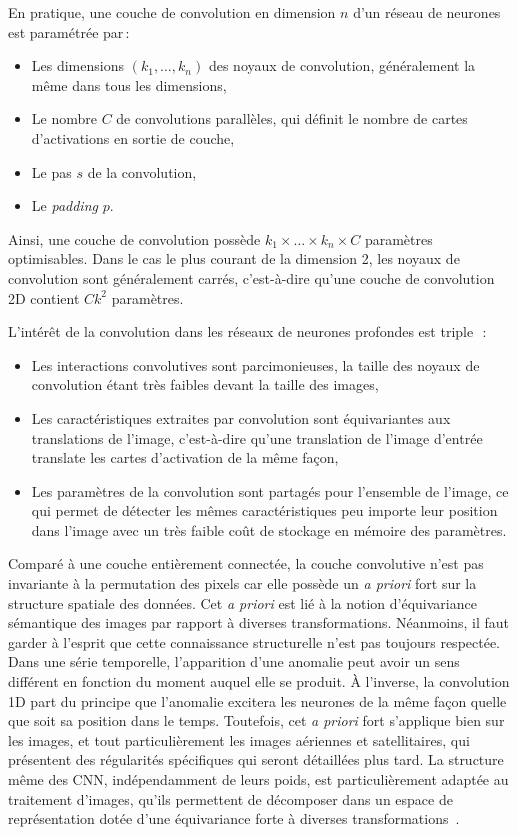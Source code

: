 En pratique, une couche de convolution en dimension $n$ d'un réseau de neurones est paramétrée par\,:
\begin{itemize}
  \item Les dimensions $(k_1, \dots, k_n)$ des noyaux de convolution, généralement la même dans tous les dimensions,
  \item Le nombre $C$ de convolutions parallèles, qui définit le nombre de cartes d'activations en sortie de couche,
  \item Le pas $s$ de la convolution,
  \item Le \emph{padding} $p$.
\end{itemize}

Ainsi, une couche de convolution possède $k_1 \times \dots \times k_n \times C$ paramètres optimisables. Dans le cas le plus courant de la dimension 2, les noyaux de convolution sont généralement carrés, c'est-à-dire qu'une couche de convolution 2D contient $C k^2$ paramètres.

L'intérêt de la convolution dans les réseaux de neurones profondes est triple~\cite{goodfellow_deep_2016}\,:
\begin{itemize}
  \item Les interactions convolutives sont parcimonieuses, la taille des noyaux de convolution étant très faibles devant la taille des images,
  \item Les caractéristiques extraites par convolution sont équivariantes aux translations de l'image, c'est-à-dire qu'une translation de l'image d'entrée translate les cartes d'activation de la même façon,
  \item Les paramètres de la convolution sont partagés pour l'ensemble de l'image, ce qui permet de détecter les mêmes caractéristiques peu importe leur position dans l'image avec un très faible coût de stockage en mémoire des paramètres.
\end{itemize}
Comparé à une couche entièrement connectée, la couche convolutive n'est pas invariante à la permutation des pixels car elle possède un \emph{a priori} fort sur la structure spatiale des données. Cet \emph{a priori} est lié à la notion d'équivariance sémantique des images par rapport à diverses transformations. Néanmoins, il faut garder à l'esprit que cette connaissance structurelle n'est pas toujours respectée. Dans une série temporelle, l'apparition d'une anomalie peut avoir un sens différent en fonction du moment auquel elle se produit. À l'inverse, la convolution 1D part du principe que l'anomalie excitera les neurones de la même façon quelle que soit sa position dans le temps. Toutefois, cet \emph{a priori} fort s'applique bien sur les images, et tout particulièrement les images aériennes et satellitaires, qui présentent des régularités spécifiques qui seront détaillées plus tard. La structure même des \gls{CNN}, indépendamment de leurs poids, est particulièrement adaptée au traitement d'images, qu'ils permettent de décomposer dans un espace de représentation dotée d'une équivariance forte à diverses transformations~\cite{ulyanov_deep_2017}.

